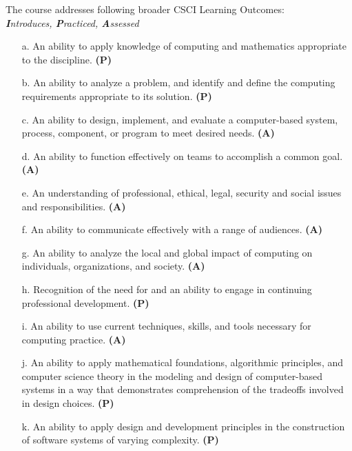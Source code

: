 \documentclass[12pt]{article}
\begin{document}
  The course addresses following broader CSCI Learning Outcomes: \\
  \textit{\textbf{I}ntroduces, \textbf{P}racticed, \textbf{A}ssessed} \\
  \begin{itemize}
    \item[a.] An ability to apply knowledge of computing and mathematics appropriate to the discipline. \textbf{(P)}
    \item[b.]  An ability to analyze a problem, and identify and define the computing requirements appropriate to its solution. \textbf{(P)}
    \item[c.] An ability to design, implement, and evaluate a computer-based system, process, component, or program to meet desired needs. \textbf{(A)}
    \item[d.] An ability to function effectively on teams to accomplish a common goal. \textbf{(A)}
    \item[e.] An understanding of professional, ethical, legal, security and social issues and responsibilities. \textbf{(A)}
    \item[f.] An ability to communicate effectively with a range of audiences. \textbf{(A)}
    \item[g.] An ability to analyze the local and global impact of computing on individuals, organizations, and society. \textbf{(A)}
    \item[h.] Recognition of the need for and an ability to engage in continuing professional development. \textbf{(P)}
    \item[i.] An ability to use current techniques, skills, and tools necessary for computing practice. \textbf{(A)}
    \item[j.] An ability to apply mathematical foundations, algorithmic principles, and computer science theory in the modeling and design of computer-based systems in a way that demonstrates comprehension of the tradeoffs involved in design choices. \textbf{(P)} 
    \item[k.] An ability to apply design and development principles in the construction of software systems of varying complexity. \textbf{(P)}
  \end{itemize}
\end{document}
